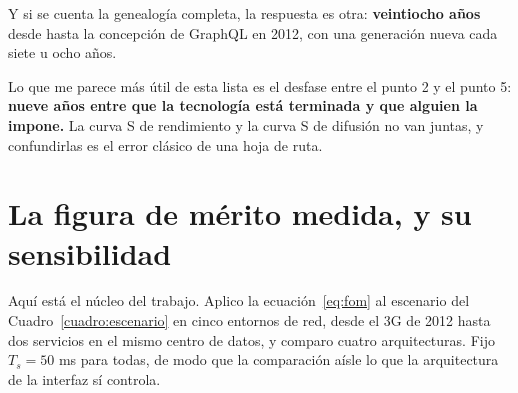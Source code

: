 \documentclass[11pt,letterpaper]{article}
\begin{document}
Y si se cuenta la genealogía completa, la respuesta es otra: \textbf{veintiocho
años} desde \textcite{birrell1984} hasta la concepción de GraphQL en 2012,
con una generación nueva cada siete u ocho años.

Lo que me parece más útil de esta lista es el desfase entre el punto 2 y el
punto 5: \textbf{nueve años entre que la tecnología está terminada y que
alguien la impone.} La curva S de rendimiento y la curva S de difusión no van
juntas, y confundirlas es el error clásico de una hoja de ruta.

\section{La figura de mérito medida, y su sensibilidad}
\label{sec:sensibilidad}

Aquí está el núcleo del trabajo. Aplico la ecuación~\eqref{eq:fom} al escenario
del Cuadro~\ref{cuadro:escenario} en cinco entornos de red, desde el 3G de 2012
hasta dos servicios en el mismo centro de datos, y comparo cuatro
arquitecturas. Fijo $T_{s} = 50$ ms para todas, de modo que la comparación
aísle lo que la arquitectura de la interfaz sí controla.
\end{document}
